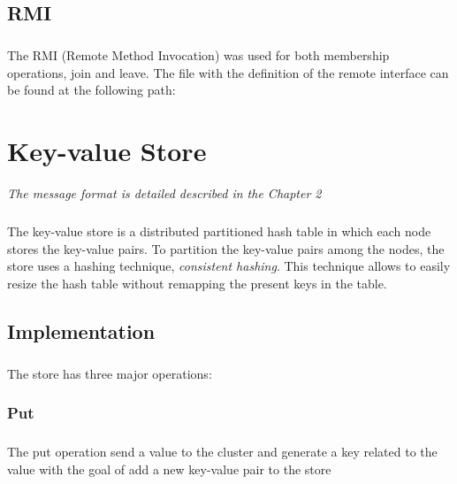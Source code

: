 \documentclass{report}
\begin{document}
			\section{RMI}
				\paragraph{} The RMI (Remote Method Invocation) was used for both
				membership operations, join and leave. The file with the definition 
				of the remote interface can be found at the following path:

				\begin{center}
				\end{center}
				
	\chapter{Key-value Store}
			\emph{The message format is detailed described in the Chapter 2}
	
	        \paragraph{} The key-value store is a distributed partitioned hash 
			table in which each node stores the key-value pairs.
			To partition the key-value pairs among the nodes, the store uses a hashing
			technique, \emph{consistent hashing}. This technique allows to easily resize the
			hash table without remapping the present keys in the table.
	        
			\section{Implementation}

				\paragraph{} The store has three major operations:
				
				\subsection{Put}
					\paragraph{} The put operation send a value to the cluster and generate a key
					related to the value with the goal of add a new key-value pair to the store
\end{document}
